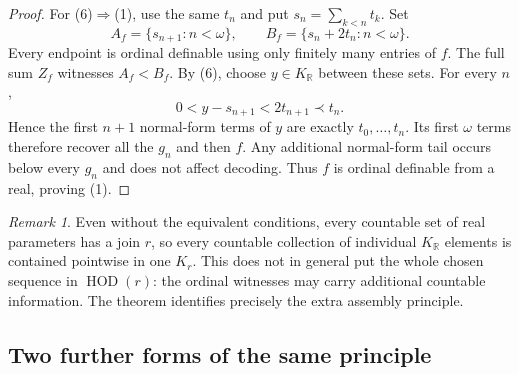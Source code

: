 \documentclass[11pt,a4paper]{article}
\numberwithin{equation}{section}
\theoremstyle{definition}
\theoremstyle{remark}
\newtheorem{remark}[remark]{Remark}
\newcommand{\R}{\mathbb R}
\newcommand{\KR}{K_{\R}}
\begin{document}
\begin{proof}
For (6)$\Rightarrow$(1), use the same $t_n$ and put
$s_n=\sum_{k<n}t_k$.  Set
\[
 A_f=\{s_{n+1}:n<\omega\},\qquad
 B_f=\{s_n+2t_n:n<\omega\}.
\]
Every endpoint is ordinal definable using only finitely many entries
of $f$.  The full sum $Z_f$ witnesses $A_f<B_f$.  By (6), choose
$y\in\KR$ between these sets.  For every $n$,
\[
 0<y-s_{n+1}<2t_{n+1}\prec t_n.
\]
Hence the first $n+1$ normal-form terms of $y$ are exactly
$t_0,\ldots,t_n$.  Its first $\omega$ terms therefore recover all the
$g_n$ and then $f$.  Any additional normal-form tail occurs below
every $g_n$ and does not affect decoding.  Thus $f$ is ordinal
definable from a real, proving (1).
\end{proof}

\begin{remark}
Even without the equivalent conditions, every countable set of real
parameters has a join $r$, so every countable collection of individual
$\KR$ elements is contained pointwise in one
$K_r$.  This does not in general put the whole chosen
sequence in $\operatorname{HOD}(r)$: the ordinal witnesses may carry
additional countable information.  The theorem identifies precisely
the extra assembly principle.
\end{remark}


\subsection{Two further forms of the same principle}
\end{document}
